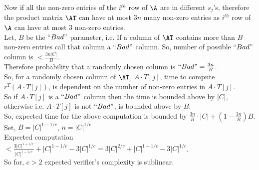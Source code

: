 Now if all the non-zero entries of the $i^{th}$ row of $\A$ are in different $s_j$'s, therefore the product matrix $\AT$ can have at most $3n$ many non-zero entries as $i^{th}$ row of $\A$ can have at most 3 non-zero entries.\\
Let, $B$ be the $``Bad"$ parameter, i.e. If a column of $\AT$ contains more than $B$ non-zero entries call that column a $``Bad"$ column. So, number of possible $``Bad"$ column is $< \frac{3n|C|}{B}$.\\
Therefore probability that a randomly chosen column is $``Bad"= \frac{3n}{B}$.\\
So, for a randomly chosen column of $\AT$, $A\cdot T[j]$, time to compute $r^T(A\cdot T[j])$, is dependent on the number of non-zero entries in $A\cdot T[j]$.\\
So if $A\cdot T[j]$ is a $``Bad"$ column then the time is bounded above by $|C|$, otherwise i.e. $A\cdot T[j]$ is not $``Bad"$, is bounded above by $B$.\\
So, expected time for the above computation is bounded by $\frac{3n}{B}\cdot |C|+ (1-\frac{3n}{B})B$.
Set, $B=|C|^{1-1/c}$, $n=|C|^{1/c}$\\
Expected computation $< \frac{3|C|^{1+1/c}}{|C|^{1-1/c}} + |C|^{1-1/c} - 3|C|^{1/c} = 3|C|^{2/c} + |C|^{1-1/c} - 3|C|^{1/c}$.\\
So for, $c > 2$ expected verifier's complexity is sublinear. 
 

